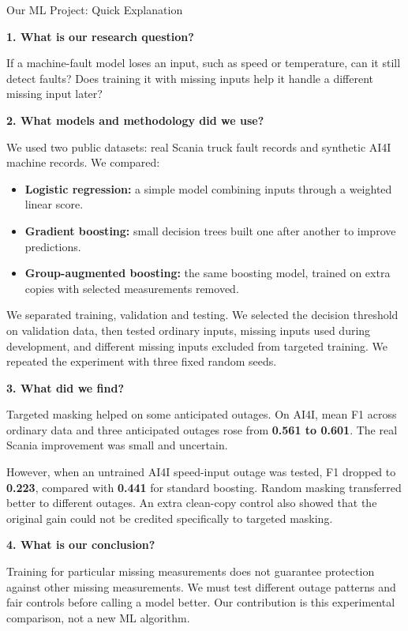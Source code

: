 \documentclass[11pt,a4paper]{article}
\begin{document}
\begin{center}\Large Our ML Project: Quick Explanation\end{center}

\textbf{1. What is our research question?}

If a machine-fault model loses an input, such as speed or temperature, can it still detect faults? Does training it with missing inputs help it handle a different missing input later?

\textbf{2. What models and methodology did we use?}

We used two public datasets: real Scania truck fault records and synthetic AI4I machine records. We compared:
\begin{itemize}
\item \textbf{Logistic regression:} a simple model combining inputs through a weighted linear score.
\item \textbf{Gradient boosting:} small decision trees built one after another to improve predictions.
\item \textbf{Group-augmented boosting:} the same boosting model, trained on extra copies with selected measurements removed.
\end{itemize}

We separated training, validation and testing. We selected the decision threshold on validation data, then tested ordinary inputs, missing inputs used during development, and different missing inputs excluded from targeted training. We repeated the experiment with three fixed random seeds.

\textbf{3. What did we find?}

Targeted masking helped on some anticipated outages. On AI4I, mean F1 across ordinary data and three anticipated outages rose from \textbf{0.561 to 0.601}. The real Scania improvement was small and uncertain.

However, when an untrained AI4I speed-input outage was tested, F1 dropped to \textbf{0.223}, compared with \textbf{0.441} for standard boosting. Random masking transferred better to different outages. An extra clean-copy control also showed that the original gain could not be credited specifically to targeted masking.

\textbf{4. What is our conclusion?}

Training for particular missing measurements does not guarantee protection against other missing measurements. We must test different outage patterns and fair controls before calling a model better. Our contribution is this experimental comparison, not a new ML algorithm.
\end{document}
